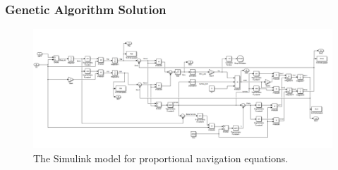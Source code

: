 \documentclass{beamer}
\begin{document}
\begin{frame}
\frametitle{Genetic Algorithm Solution}
\begin{figure}[H]
\centering
\includegraphics[scale = 0.3]{fig/PNeq.PNG}
\caption{The Simulink model for proportional navigation equations.}
\label{PN eq}
\end{figure}
\end{frame}
\end{document}
